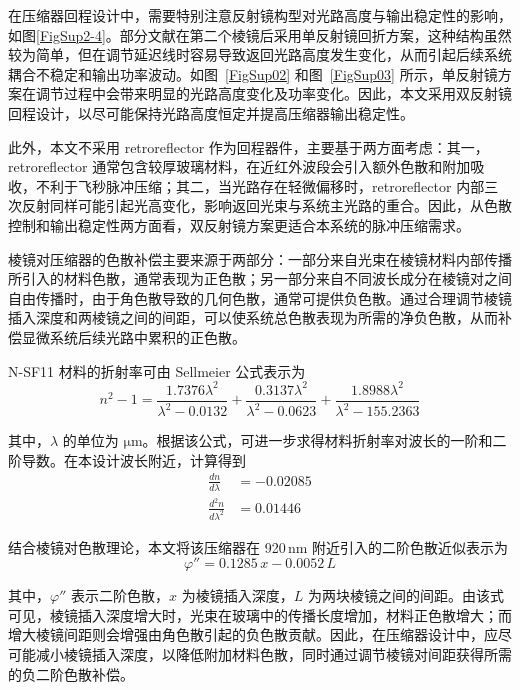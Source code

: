 在压缩器回程设计中，需要特别注意反射镜构型对光路高度与输出稳定性的影响，如图\ref{FigSup2-4}。部分文献在第二个棱镜后采用单反射镜回折方案，这种结构虽然较为简单，但在调节延迟线时容易导致返回光路高度发生变化，从而引起后续系统耦合不稳定和输出功率波动。如图~\ref{FigSup02} 和图~\ref{FigSup03} 所示，单反射镜方案在调节过程中会带来明显的光路高度变化及功率变化。因此，本文采用双反射镜回程设计，以尽可能保持光路高度恒定并提高压缩器输出稳定性。

此外，本文不采用 retroreflector 作为回程器件，主要基于两方面考虑：其一，retroreflector 通常包含较厚玻璃材料，在近红外波段会引入额外色散和附加吸收，不利于飞秒脉冲压缩；其二，当光路存在轻微偏移时，retroreflector 内部三次反射同样可能引起光高变化，影响返回光束与系统主光路的重合。因此，从色散控制和输出稳定性两方面看，双反射镜方案更适合本系统的脉冲压缩需求。

棱镜对压缩器的色散补偿主要来源于两部分：一部分来自光束在棱镜材料内部传播所引入的材料色散，通常表现为正色散；另一部分来自不同波长成分在棱镜对之间自由传播时，由于角色散导致的几何色散，通常可提供负色散。通过合理调节棱镜插入深度和两棱镜之间的间距，可以使系统总色散表现为所需的净负色散，从而补偿显微系统后续光路中累积的正色散。

N-SF11 材料的折射率可由 Sellmeier 公式表示为
\begin{equation}
    n^{2}-1=
    \frac{1.7376\lambda^{2}}{\lambda^{2}-0.0132}
    +\frac{0.3137\lambda^{2}}{\lambda^{2}-0.0623}
    +\frac{1.8988\lambda^{2}}{\lambda^{2}-155.2363}
\end{equation}

其中，$\lambda$ 的单位为 $\mathrm{\mu m}$。根据该公式，可进一步求得材料折射率对波长的一阶和二阶导数。在本设计波长附近，计算得到
\begin{align}
    \frac{dn}{d\lambda} &= -0.02085\\
    \frac{d^{2}n}{d\lambda^{2}} &= 0.01446
\end{align}

结合棱镜对色散理论，本文将该压缩器在 920\,nm 附近引入的二阶色散近似表示为
\begin{equation}
    \varphi'' = 0.1285\,x - 0.0052\,L
\end{equation}

其中，$\varphi''$ 表示二阶色散，$x$ 为棱镜插入深度，$L$ 为两块棱镜之间的间距。由该式可见，棱镜插入深度增大时，光束在玻璃中的传播长度增加，材料正色散增大；而增大棱镜间距则会增强由角色散引起的负色散贡献。因此，在压缩器设计中，应尽可能减小棱镜插入深度，以降低附加材料色散，同时通过调节棱镜对间距获得所需的负二阶色散补偿。

